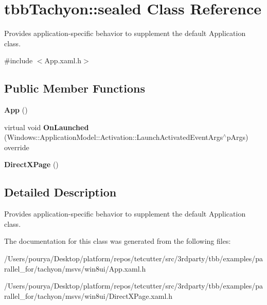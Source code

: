 \hypertarget{classtbbTachyon_1_1sealed}{}\section{tbb\+Tachyon\+:\+:sealed Class Reference}
\label{classtbbTachyon_1_1sealed}


Provides application-\/specific behavior to supplement the default Application class.  




{\ttfamily \#include $<$App.\+xaml.\+h$>$}

\subsection*{Public Member Functions}
\begin{DoxyCompactItemize}
\item 
\hypertarget{classtbbTachyon_1_1sealed_a614a61fdef59b13b07eefe0a3ce35c4b}{}{\bfseries App} ()\label{classtbbTachyon_1_1sealed_a614a61fdef59b13b07eefe0a3ce35c4b}

\item 
\hypertarget{classtbbTachyon_1_1sealed_acf00d029284344e7d5d5a23b1b33d467}{}virtual void {\bfseries On\+Launched} (Windows\+::\+Application\+Model\+::\+Activation\+::\+Launch\+Activated\+Event\+Args$^\wedge$p\+Args) override\label{classtbbTachyon_1_1sealed_acf00d029284344e7d5d5a23b1b33d467}

\item 
\hypertarget{classtbbTachyon_1_1sealed_a06d7873f20ca2f9efc064d2d8733153c}{}{\bfseries Direct\+X\+Page} ()\label{classtbbTachyon_1_1sealed_a06d7873f20ca2f9efc064d2d8733153c}

\end{DoxyCompactItemize}


\subsection{Detailed Description}
Provides application-\/specific behavior to supplement the default Application class. 



The documentation for this class was generated from the following files\+:\begin{DoxyCompactItemize}
\item 
/\+Users/pourya/\+Desktop/platform/repos/tetcutter/src/3rdparty/tbb/examples/parallel\+\_\+for/tachyon/msvs/win8ui/App.\+xaml.\+h\item 
/\+Users/pourya/\+Desktop/platform/repos/tetcutter/src/3rdparty/tbb/examples/parallel\+\_\+for/tachyon/msvs/win8ui/Direct\+X\+Page.\+xaml.\+h\end{DoxyCompactItemize}
